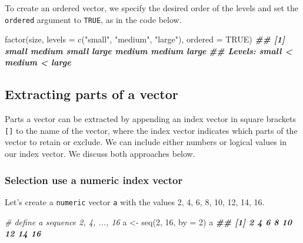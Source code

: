 \documentclass[
]{book}
\newenvironment{Shaded}{\begin{snugshade}}{\end{snugshade}}
\newcommand{\AttributeTok}[1]{\textcolor[rgb]{0.77,0.63,0.00}{#1}}
\newcommand{\CommentTok}[1]{\textcolor[rgb]{0.56,0.35,0.01}{\textit{#1}}}
\newcommand{\ConstantTok}[1]{\textcolor[rgb]{0.00,0.00,0.00}{#1}}
\newcommand{\DecValTok}[1]{\textcolor[rgb]{0.00,0.00,0.81}{#1}}
\newcommand{\DocumentationTok}[1]{\textcolor[rgb]{0.56,0.35,0.01}{\textbf{\textit{#1}}}}
\newcommand{\FunctionTok}[1]{\textcolor[rgb]{0.00,0.00,0.00}{#1}}
\newcommand{\NormalTok}[1]{#1}
\newcommand{\OtherTok}[1]{\textcolor[rgb]{0.56,0.35,0.01}{#1}}
\newcommand{\StringTok}[1]{\textcolor[rgb]{0.31,0.60,0.02}{#1}}
\theoremstyle{definition}
\theoremstyle{definition}
\theoremstyle{definition}
\theoremstyle{definition}
\theoremstyle{remark}
\begin{document}
\begin{yourturn}
To create an ordered vector, we specify the desired order of the levels and set the \texttt{ordered} argument to \texttt{TRUE}, as in the code below.

\begin{Shaded}
\begin{Highlighting}[]
\FunctionTok{factor}\NormalTok{(size, }\AttributeTok{levels =} \FunctionTok{c}\NormalTok{(}\StringTok{"small"}\NormalTok{, }\StringTok{"medium"}\NormalTok{, }\StringTok{"large"}\NormalTok{), }\AttributeTok{ordered =} \ConstantTok{TRUE}\NormalTok{)}
\DocumentationTok{\#\# [1] small  medium small  large  medium medium large }
\DocumentationTok{\#\# Levels: small \textless{} medium \textless{} large}
\end{Highlighting}
\end{Shaded}

\end{yourturn}

\hypertarget{extracting-parts-of-a-vector}{%
\subsection{Extracting parts of a vector}\label{extracting-parts-of-a-vector}}

Parts a vector can be extracted by appending an index vector in square brackets \texttt{{[}{]}} to the name of the vector, where the index vector indicates which parts of the vector to retain or exclude. We can include either numbers or logical values in our index vector. We discuss both approaches below.

\hypertarget{selection-use-a-numeric-index-vector}{%
\subsubsection{Selection use a numeric index vector}\label{selection-use-a-numeric-index-vector}}

Let's create a \texttt{numeric} vector \texttt{a} with the values 2, 4, 6, 8, 10, 12, 14, 16.

\begin{Shaded}
\begin{Highlighting}[]
\CommentTok{\# define a sequence 2, 4, ..., 16}
\NormalTok{a }\OtherTok{\textless{}{-}} \FunctionTok{seq}\NormalTok{(}\DecValTok{2}\NormalTok{, }\DecValTok{16}\NormalTok{, }\AttributeTok{by =} \DecValTok{2}\NormalTok{)}
\NormalTok{a}
\DocumentationTok{\#\# [1]  2  4  6  8 10 12 14 16}
\end{Highlighting}
\end{Shaded}
\end{document}
